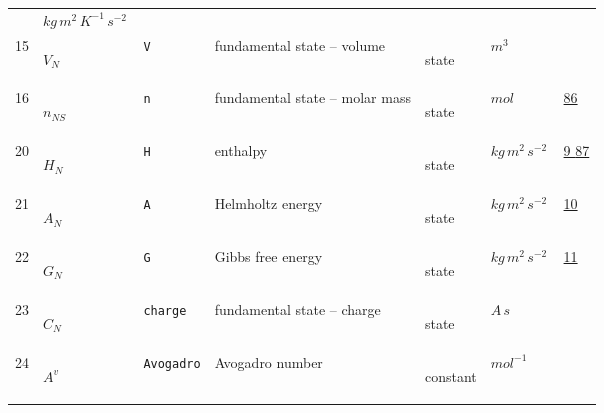 \begin{longtable}{|p{1cm}|p{2.5cm}|p{4.5cm}|p{8cm}|p{3.0cm}|p{3cm}|p{1cm}|}
             & $ kg \,m^{2} \,K^{-1} \,s^{-2} \, $
             & \\
    15
             & \hypertarget{"v:15"}{ $ {V}{_{N}} $}
             & \verb|V|
             & fundamental state -- volume
             & \begin{lay}state \end{lay}
             & $ m^{3} \, $
             & \\
    16
             & \hypertarget{"v:16"}{ $ {n}{_{{N S}}} $}
             & \verb|n|
             & fundamental state -- molar mass
             & \begin{lay}state \end{lay}
             & $ mol \, $
             & \hyperlink{"e:86"}{ 86 }
                 \\
    20
             & \hypertarget{"v:20"}{ $ {H}{_{N}} $}
             & \verb|H|
             & enthalpy
             & \begin{lay}state \end{lay}
             & $ kg \,m^{2} \,s^{-2} \, $
             & \hyperlink{"e:9"}{ 9 }
                 \hyperlink{"e:87"}{ 87 }
                 \\
    21
             & \hypertarget{"v:21"}{ $ {A}{_{N}} $}
             & \verb|A|
             & Helmholtz energy
             & \begin{lay}state \end{lay}
             & $ kg \,m^{2} \,s^{-2} \, $
             & \hyperlink{"e:10"}{ 10 }
                 \\
    22
             & \hypertarget{"v:22"}{ $ {G}{_{N}} $}
             & \verb|G|
             & Gibbs free energy
             & \begin{lay}state \end{lay}
             & $ kg \,m^{2} \,s^{-2} \, $
             & \hyperlink{"e:11"}{ 11 }
                 \\
    23
             & \hypertarget{"v:23"}{ $ {C}{_{N}} $}
             & \verb|charge|
             & fundamental state -- charge
             & \begin{lay}state \end{lay}
             & $ A \,s \, $
             & \\
    24
             & \hypertarget{"v:24"}{ $ {{A^v}}{_{}} $}
             & \verb|Avogadro|
             & Avogadro number
             & \begin{lay}constant \end{lay}
             & $ mol^{-1} \, $

\end{longtable}
